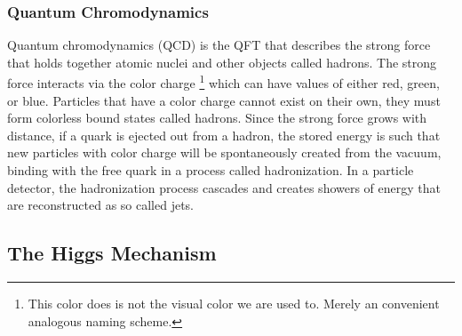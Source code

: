 
		\subsubsection{Quantum Chromodynamics}\label{sssec:QCD}
		
		Quantum chromodynamics (QCD) is the QFT that describes the strong force that holds together atomic nuclei and other objects called hadrons. The strong force interacts via the color charge \footnote{This color does is not the visual color we are used to. Merely an convenient analogous naming scheme.} which can have values of either red, green, or blue. Particles that have a color charge cannot exist on their own, they must form colorless bound states called hadrons. Since the strong force grows with distance, if a quark is ejected out from a hadron, the stored energy is such that new particles with color charge will be spontaneously created from the vacuum, binding with the free quark in a process called hadronization. In a particle detector, the hadronization process cascades and creates showers of energy that are reconstructed as so called jets.

	\subsection{The Higgs Mechanism}\label{ssec:Higgs}


